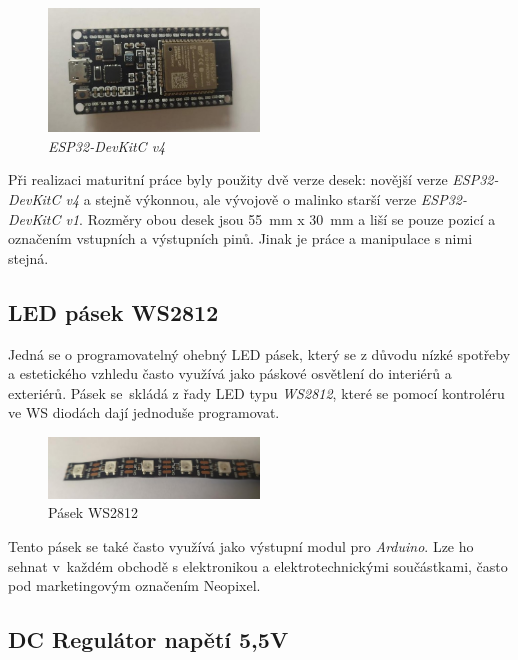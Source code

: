 \begin{figure}[htbp]
	\centering
	\includegraphics[width=0.5\textwidth]{img/02 ele/ESPDevKit3.jpg}
	\caption{\textit{ESP32-DevKitC v4}}
\end{figure}

Při realizaci maturitní práce byly použity dvě verze desek: novější verze \textit{ESP32-DevKitC v4} a stejně výkonnou, ale vývojově o malinko starší verze \textit{ESP32-DevKitC v1}. Rozměry obou desek jsou 55~mm x 30~mm a liší se pouze pozicí a označením vstupních a výstupních pinů. Jinak je práce a manipulace s nimi stejná. 

\subsection{LED pásek WS2812}

Jedná se o programovatelný ohebný LED pásek, který se z důvodu nízké spotřeby a estetického vzhledu často využívá jako páskové osvětlení do interiérů a exteriérů. Pásek se~skládá z řady LED typu \textit{WS2812}\cite{WS2812}, které se pomocí kontroléru ve WS diodách dají jednoduše programovat. 

\begin{figure}[htbp]
	\centering
	\includegraphics[width=0.5\textwidth]{img/02 ele/OhebnyLedPasek2.jpg}
	\caption{Pásek WS2812}
\end{figure}

Tento pásek se také často využívá jako výstupní modul pro \textit{Arduino}. Lze ho sehnat v~každém obchodě s elektronikou a elektrotechnickými součástkami, často pod marketingovým označením Neopixel\cite{neopixel}. 

\subsection{DC Regulátor napětí 5,5V}


